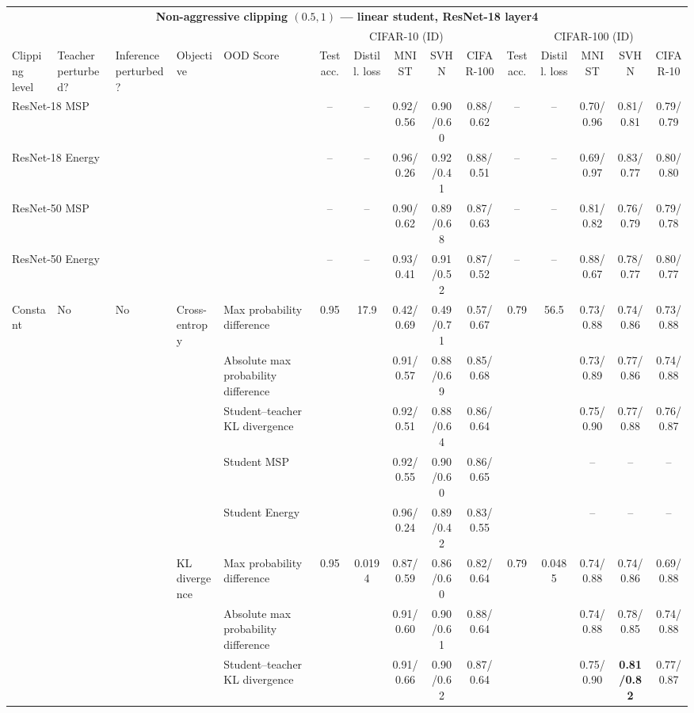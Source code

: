 \documentclass[border=2pt]{standalone}
\begin{document}
\scriptsize
\setlength{\tabcolsep}{4pt}
\begin{tabular}{lllllcccccccccc}
\multicolumn{15}{c}{\textbf{Non-aggressive clipping $(0.5, 1)$ --- linear student, ResNet-18 layer4}}\\[4pt]
\multicolumn{5}{c}{} & \multicolumn{5}{c}{CIFAR-10 (ID)} & \multicolumn{5}{c}{CIFAR-100 (ID)} \\
\cmidrule(lr){6-10} \cmidrule(lr){11-15}
\toprule
Clipping level & Teacher perturbed? & Inference perturbed? & Objective & OOD Score & Test acc. & Distill. loss & MNIST & SVHN & CIFAR-100 & Test acc. & Distill. loss & MNIST & SVHN & CIFAR-10 \\
\midrule
\multicolumn{5}{l}{ResNet-18 MSP} & -- & -- & 0.92/0.56 & 0.90/0.60 & 0.88/0.62 & -- & -- & 0.70/0.96 & 0.81/0.81 & 0.79/0.79 \\
\multicolumn{5}{l}{ResNet-18 Energy} & -- & -- & 0.96/0.26 & 0.92/0.41 & 0.88/0.51 & -- & -- & 0.69/0.97 & 0.83/0.77 & 0.80/0.80 \\
\multicolumn{5}{l}{ResNet-50 MSP} & -- & -- & 0.90/0.62 & 0.89/0.68 & 0.87/0.63 & -- & -- & 0.81/0.82 & 0.76/0.79 & 0.79/0.78 \\
\multicolumn{5}{l}{ResNet-50 Energy} & -- & -- & 0.93/0.41 & 0.91/0.52 & 0.87/0.52 & -- & -- & 0.88/0.67 & 0.78/0.77 & 0.80/0.77 \\
\midrule
Constant & No & No & Cross-entropy & Max probability difference & 0.95 & 17.9 & 0.42/0.69 & 0.49/0.71 & 0.57/0.67 & 0.79 & 56.5 & 0.73/0.88 & 0.74/0.86 & 0.73/0.88 \\
 &  &  &  & Absolute max probability difference &  &  & 0.91/0.57 & 0.88/0.69 & 0.85/0.68 &  &  & 0.73/0.89 & 0.77/0.86 & 0.74/0.88 \\
 &  &  &  & Student--teacher KL divergence &  &  & 0.92/0.51 & 0.88/0.64 & 0.86/0.64 &  &  & 0.75/0.90 & 0.77/0.88 & 0.76/0.87 \\
 &  &  &  & Student MSP &  &  & 0.92/0.55 & 0.90/0.60 & 0.86/0.65 &  &  & -- & -- & -- \\
 &  &  &  & Student Energy &  &  & 0.96/0.24 & 0.89/0.42 & 0.83/0.55 &  &  & -- & -- & -- \\
 &  &  & KL divergence & Max probability difference & 0.95 & 0.0194 & 0.87/0.59 & 0.86/0.60 & 0.82/0.64 & 0.79 & 0.0485 & 0.74/0.88 & 0.74/0.86 & 0.69/0.88 \\
 &  &  &  & Absolute max probability difference &  &  & 0.91/0.60 & 0.90/0.61 & 0.88/0.64 &  &  & 0.74/0.88 & 0.78/0.85 & 0.74/0.88 \\
 &  &  &  & Student--teacher KL divergence &  &  & 0.91/0.66 & 0.90/0.62 & 0.87/0.64 &  &  & 0.75/0.90 & \textbf{0.81/0.82} & 0.77/0.87 \\

\end{tabular}
\end{document}
